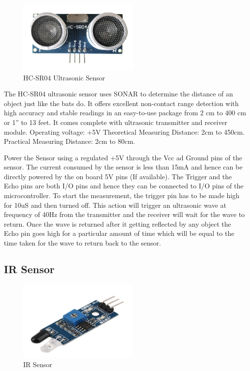 	\begin{figure}[h]
		\centering
	\includegraphics[width=60mm,scale=1]{43}
	\caption{HC-SR04 Ultrasonic Sensor}
	\label{HC-SR04 Ultrasonic Sensor}
	
\end{figure}

 The HC-SR04 ultrasonic sensor uses SONAR to determine the distance of an object just like the bats do. It offers excellent non-contact range detection with high accuracy and stable readings in an easy-to-use package from 2 cm to 400 cm or 1” to 13 feet.  It comes complete with ultrasonic transmitter and receiver module. Operating voltage: +5V  Theoretical Measuring Distance: 2cm to 450cm. Practical Measuring Distance: 2cm to 80cm.
 
  Power the Sensor using a regulated +5V through the Vcc ad Ground pins of the sensor. The current consumed by the sensor is less than 15mA and hence can be directly powered by the on board 5V pins (If available). The Trigger and the Echo pins are both I/O pins and hence they can be connected to I/O pins of the microcontroller. To start the measurement, the trigger pin has to be made high for 10uS and then turned off. This action will trigger an ultrasonic wave at frequency of 40Hz from the transmitter and the receiver will wait for the wave to return. Once the wave is returned after it getting reflected by any object the Echo pin goes high for a particular amount of time which will be equal to the time taken for the wave to return back to the sensor.
 
\newpage

\subsection{IR Sensor}

	\begin{figure}[h]
		\centering
	\includegraphics[width=60mm,scale=1]{44}
	\caption{IR Sensor}
	\label{IR Sensor}
	
\end{figure}

